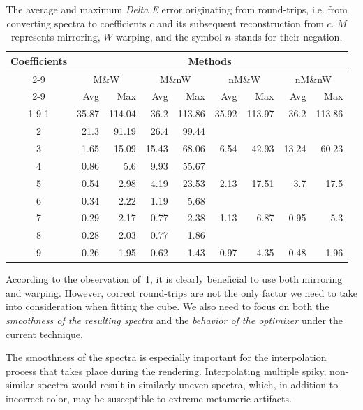 \begin{table}[t]
	\centering
	\begin{tabular}{crrrrrrrr}
		\toprule
		\multirow{4}{*}{Coefficients} &
		\multicolumn{8}{c}{Methods} \\
		\cmidrule(lr){2-9}
		&\multicolumn{2}{c}{M\&W} &
		\multicolumn{2}{c}{M\&nW} &
		\multicolumn{2}{c}{nM\&W} &
		\multicolumn{2}{c}{nM\&nW}\\
		\cmidrule(lr){2-9}
		& Avg & Max & Avg & Max & Avg & Max & Avg & Max \\
		\cmidrule(lr){1-9}
		1&35.87&114.04&36.2&113.86&35.92&113.97&36.2&113.86\\
		2&21.3&91.19&26.4&99.44&\textemdash&\textemdash&\textemdash&\textemdash\\
		3&1.65&15.09&15.43&68.06&6.54&42.93&13.24&60.23\\
		4&0.86&5.6&9.93&55.67&\textemdash&\textemdash&\textemdash&\textemdash\\
		5&0.54&2.98&4.19&23.53&2.13&17.51&3.7&17.5\\
		6&0.34&2.22&1.19&5.68&\textemdash&\textemdash&\textemdash&\textemdash\\
		7&0.29&2.17&0.77&2.38&1.13&6.87&0.95&5.3\\
		8&0.28&2.03&0.77&1.86&\textemdash&\textemdash&\textemdash&\textemdash\\
		9&0.26&1.95&0.62&1.43&0.97&4.35&0.48&1.96\\
		\bottomrule
	\end{tabular}
	\caption{The average and maximum \emph{Delta E} error originating from round-trips, i.e. from converting spectra to coefficients $c$ and its subsequent reconstruction from $c$. $M$ represents mirroring, $W$ warping, and the symbol $n$ stands for their negation.}
	\label{table:comparisonMomentTechnique}
\end{table}

According to the observation of~\cref{table:comparisonMomentTechnique}, it is clearly beneficial to use both mirroring and warping. However, correct round-trips are not the only factor we need to take into consideration when fitting the cube. We also need to focus on both the \emph{smoothness of the resulting spectra} and the \emph{behavior of the optimizer} under the current technique.

The smoothness of the spectra is especially important for the interpolation process that takes place during the rendering. Interpolating multiple spiky, non-similar spectra would result in similarly uneven spectra, which, in addition to incorrect color, may be susceptible to extreme metameric artifacts.  

